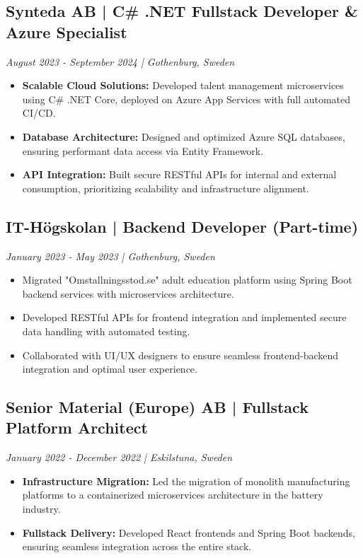 \documentclass[11pt,a4paper]{article}
\begin{document}
\subsection*{Synteda AB | C\# .NET Fullstack Developer \& Azure Specialist}
\textit{August 2023 - September 2024 | Gothenburg, Sweden}
\begin{itemize}[noitemsep]
\item \textbf{Scalable Cloud Solutions:} Developed talent management microservices using C\# .NET Core, deployed on Azure App Services with full automated CI/CD.
\item \textbf{Database Architecture:} Designed and optimized Azure SQL databases, ensuring performant data access via Entity Framework.
\item \textbf{API Integration:} Built secure RESTful APIs for internal and external consumption, prioritizing scalability and infrastructure alignment.
\end{itemize}

\subsection*{IT-Högskolan | Backend Developer (Part-time)}
\textit{January 2023 - May 2023 | Gothenburg, Sweden}
\begin{itemize}[noitemsep]
\item Migrated "Omstallningsstod.se" adult education platform using Spring Boot backend services with microservices architecture.
\item Developed RESTful APIs for frontend integration and implemented secure data handling with automated testing.
\item Collaborated with UI/UX designers to ensure seamless frontend-backend integration and optimal user experience.
\end{itemize}

\subsection*{Senior Material (Europe) AB | Fullstack Platform Architect}
\textit{January 2022 - December 2022 | Eskilstuna, Sweden}
\begin{itemize}[noitemsep]
\item \textbf{Infrastructure Migration:} Led the migration of monolith manufacturing platforms to a containerized microservices architecture in the battery industry.
\item \textbf{Fullstack Delivery:} Developed React frontends and Spring Boot backends, ensuring seamless integration across the entire stack.
\end{itemize}
\end{document}
